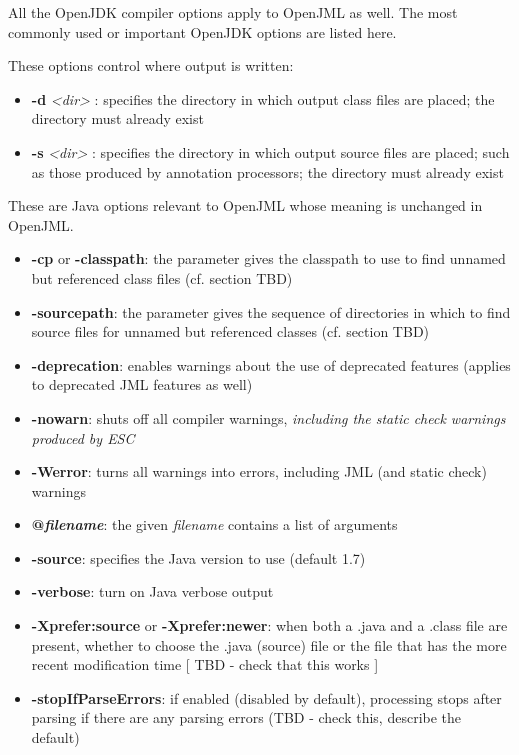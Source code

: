 All the OpenJDK compiler options apply to OpenJML as well. The most commonly used or important OpenJDK options are listed here.

These options control where output is written:
\begin{itemize}
\item \textbf{-d} {\it <dir>} : specifies the directory in which output class files are placed; the directory must already exist
\item \textbf{-s} {\it <dir>} : specifies the directory in which output source files are placed; such as those produced by annotation processors; the directory must already exist
\end{itemize}

These are Java options relevant to OpenJML whose meaning is unchanged in OpenJML. 
\begin{itemize}[noitemsep,nolistsep]
\item \textbf{-cp} or \textbf{-classpath}: the parameter gives the classpath to use to find unnamed but referenced class files (cf. section TBD)
\item \textbf{-sourcepath}: the parameter gives the sequence of directories in which to find source files for unnamed but referenced classes (cf. section TBD)
\item \textbf{-deprecation}: enables warnings about the use of deprecated features (applies to deprecated JML features as well)
\item \textbf{-nowarn}: shuts off all compiler warnings, \textit{including the static check warnings produced by ESC}
\item \textbf{-Werror}: turns all warnings into errors, including JML (and static check) warnings
\item \textbf{@\textit{filename}}: the given \textit{filename} contains a list of arguments
\item \textbf{-source}: specifies the Java version to use (default 1.7)
\item \textbf{-verbose}: turn on Java verbose output
\item \textbf{-Xprefer:source} or \textbf{-Xprefer:newer}: when both a .java and a .class file are present, 
whether to choose the .java (source) file or the file that has the more recent modification time [ TBD - check that this works ]
\item \textbf{-stopIfParseErrors}: if enabled (disabled by default), processing stops after parsing if there are any parsing errors (TBD - check this, describe the default)
\end{itemize}




